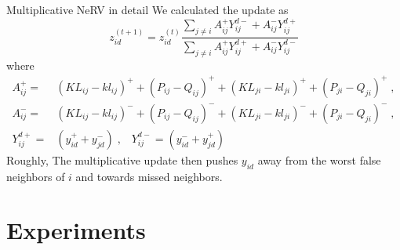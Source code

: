 \documentclass[first=dgreen,second=purple,logo=yellowexc]{aaltoslides}
\begin{document}
\begin{frame}{Multiplicative NeRV in detail}
We calculated the update as
\[
z_{id}^{(t+1)}=z_{id}^{(t)} \frac{\sum_{j\ne i}A_{ij}^+Y^{d-}_{ij}+A_{ij}^-Y^{d+}_{ij}}{\sum_{j\ne i}A_{ij}^+Y^{d+}_{ij}+A^-_{ij}Y^{d-}_{ij}}
\]
where
\begin{align*}
A_{ij}^+=&(KL_{ij}-kl_{ij})^++(P_{ij}-Q_{ij})^+ +(KL_{ji}-kl_{ji})^++(P_{ji}-Q_{ji})^+ \;,\\
A_{ij}^-=&(KL_{ij}-kl_{ij})^-+(P_{ij}-Q_{ij})^- +(KL_{ji}-kl_{ji})^-+(P_{ji}-Q_{ji})^- \;,\\
Y^{d+}_{ij}=&\left(y_{id}^++y_{jd}^-\right)\;,\;\;\;
Y^{d-}_{ij}=\left(y_{id}^-+y_{jd}^+\right)
\end{align*}
Roughly, The multiplicative update then pushes $y_{id}$ away from the worst false neighbors of $i$ and towards missed neighbors.
\end{frame}

\section{Experiments}
\end{document}
